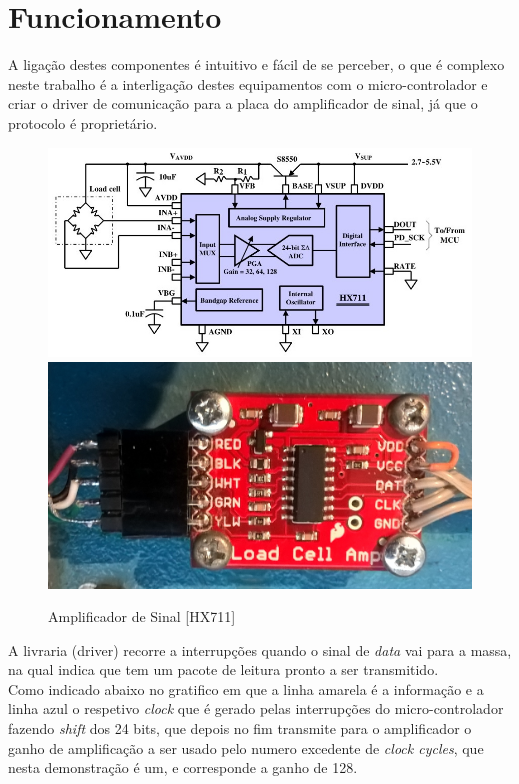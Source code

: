 \section{Funcionamento}
A ligação destes componentes é intuitivo e fácil de se perceber, o que é complexo neste trabalho é a interligação destes equipamentos com o micro-controlador e criar o driver de comunicação para a placa do amplificador de sinal, já que o protocolo é proprietário.
\begin{figure}[H]
	\captionsetup{justification=raggedright,singlelinecheck=false}
	\centering
	\includegraphics[scale=0.35]{./image/PESTA/schematic/HX711_Schematic_1.jpg}
	\includegraphics[scale=0.1]{./image/PESTA/material/HX711_board_1.jpg}
	\caption{Amplificador de Sinal [HX711]}
	\label{HX711_Schematic_1}
\end{figure}
A livraria (driver) recorre a interrupções quando o sinal de \textit{data} vai para a massa, na qual indica que tem um pacote de leitura pronto a ser transmitido.\\
Como indicado abaixo no gratifico em que a linha amarela é a informação e a linha azul o respetivo \textit{clock} que é gerado pelas interrupções do micro-controlador fazendo \textit{shift} dos 24 bits, que depois no fim transmite para o amplificador o ganho de amplificação a ser usado pelo numero excedente de \textit{clock cycles}, que nesta demonstração é um, e corresponde a ganho de 128.
